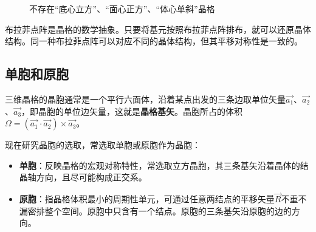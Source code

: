 \begin{figure}[!htbp]
\begin{minipage}[t]{0.3\linewidth}
        \end{minipage}
        \caption{不存在“底心立方”、“面心正方”、“体心单斜”晶格}
        \label{fig:1-06}
    \end{figure}

    布拉菲点阵是晶格的数学抽象。只要将基元按照布拉菲点阵排布，就可以还原晶体结构。同一种布拉菲点阵可以对应不同的晶体结构，但其平移对称性是一致的。

\subsection{单胞和原胞}
    三维晶格的晶胞通常是一个平行六面体，沿着某点出发的三条边取单位矢量$\vec{a_1}$、$\vec{a_2}$、$\vec{a_3}$，即晶胞的单位边矢量，这就是\textbf{晶格基矢}。晶胞所占的体积$\Omega=(\vec{a_1}\cdot \vec{a_2})\times \vec{a_3}$。

    现在研究晶胞的选取，常选取单胞或原胞作为晶胞：
    \begin{itemize}[itemsep=0pt,parsep=0pt]
        \item \textbf{单胞}：反映晶格的宏观对称特性，常选取立方晶胞，其三条基矢沿着晶体的结晶轴方向，且尽可能构成正交系。
        \item \textbf{原胞}：指晶格体积最小的周期性单元，可通过任意两结点的平移矢量$\vec{R}$不重不漏密排整个空间。原胞中只含有一个结点。原胞的三条基矢沿原胞的边的方向。
    \end{itemize}

